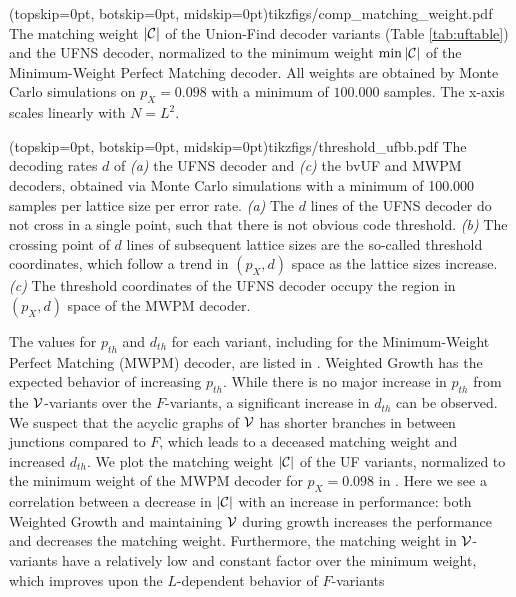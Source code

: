 \Figure[b!](topskip=0pt, botskip=0pt, midskip=0pt){tikzfigs/comp_matching_weight.pdf}{
  The matching weight $\lvert\mathcal{C}\rvert$ of the Union-Find decoder variants (Table \ref{tab:uftable}) and the UFNS decoder, normalized to the minimum weight $\min{\lvert\mathcal{C}\rvert}$ of the Minimum-Weight Perfect Matching decoder. All weights are obtained by Monte Carlo simulations on $p_X=0.098$ with a minimum of $100.000$ samples. The x-axis scales linearly with $N = L^2$. \label{comp_weight}}

\Figure[htb](topskip=0pt, botskip=0pt, midskip=0pt){tikzfigs/threshold_ufbb.pdf}{
  The decoding rates $d$ of \emph{(a)} the UFNS decoder and \emph{(c)} the bvUF and MWPM decoders, obtained via Monte Carlo simulations with a minimum of 100.000 samples per lattice size per error rate. \emph{(a)} The $d$ lines of the UFNS decoder do not cross in a single point, such that there is not obvious code threshold. \emph{(b)} The crossing point of $d$ lines of subsequent lattice sizes are the so-called threshold coordinates, which follow a trend in $(p_X, d)$ space as the lattice sizes increase. \emph{(c)} The threshold coordinates of the UFNS decoder occupy the region in $(p_X, d)$ space of the MWPM decoder. \label{threshold_ufbb}}

The values for $p_{th}$ and $d_{th}$ for each variant, including for the Minimum-Weight Perfect Matching (MWPM) decoder, are listed in . Weighted Growth has the expected behavior of increasing $p_{th}$. While there is no major increase in $p_{th}$ from the $\mathcal{V}$-variants over the $F$-variants, a significant increase in $d_{th}$ can be observed. We suspect that the acyclic graphs of $\mathcal{V}$ has shorter branches in between junctions compared to $F$, which leads to a deceased matching weight and increased $d_{th}$. We plot the matching weight $\lvert\mathcal{C}\rvert$ of the UF variants, normalized to the minimum weight of the MWPM decoder for $p_X = 0.098$ in . Here we see a correlation between a decrease in $\lvert\mathcal{C}\rvert$ with an increase in performance: both Weighted Growth and maintaining $\mathcal{V}$ during growth increases the performance and decreases the matching weight. Furthermore, the matching weight in $\mathcal{V}$-variants have a relatively low and constant factor over the minimum weight, which improves upon the $L$-dependent behavior of $F$-variants 

